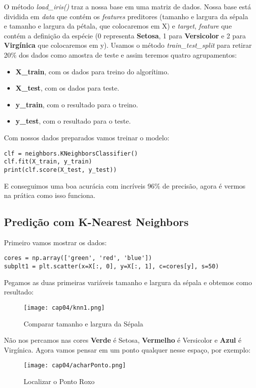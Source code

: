 O método \textit{load\_iris()} traz a nossa base em uma matriz de dados. Nossa base está dividida em \textit{data} que contém os \textit{features} preditores (tamanho e largura da sépala e tamanho e largura da pétala, que colocaremos em X) e \textit{target}, \textit{feature} que contém a definição da espécie (0 representa \textbf{Setosa}, 1 para \textbf{Versicolor} e 2 para \textbf{Virgínica} que colocaremos em y). Usamos o método \textit{train\_test\_split} para retirar 20\% dos dados como amostra de teste e assim teremos quatro agrupamentos:
\begin{itemize}[nolistsep]
	\item \textbf{X\_train}, com os dados para treino do algorítimo.
	\item \textbf{X\_test}, com os dados para teste.
	\item \textbf{y\_train}, com o resultado para o treino.
	\item \textbf{y\_test}, com o resultado para o teste.
\end{itemize}

Com nossos dados preparados vamos treinar o modelo:
\begin{lstlisting}[]
clf = neighbors.KNeighborsClassifier()
clf.fit(X_train, y_train)
print(clf.score(X_test, y_test))
\end{lstlisting}

E conseguimos uma boa acurácia com incríveis 96\% de precisão, agora é vermos na prática como isso funciona. 

\subsection{Predição com K-Nearest Neighbors}
Primeiro vamos mostrar os dados:
\begin{lstlisting}[]
cores = np.array(['green', 'red', 'blue'])
subplt1 = plt.scatter(x=X[:, 0], y=X[:, 1], c=cores[y], s=50)
\end{lstlisting}

Pegamos as duas primeiras variáveis tamanho e largura da sépala e obtemos como resultado:
\begin{figure}[H]
	\centering
	\texttt{[image: cap04/knn1.png]}
	\caption{Comparar tamanho e largura da Sépala}
\end{figure}

Não nos percamos nas cores \textbf{Verde} é Setosa, \textbf{Vermelho} é Versicolor e \textbf{Azul} é Virgínica. Agora vamos pensar em um ponto qualquer nesse espaço, por exemplo:
\begin{figure}[H]
	\centering
	\texttt{[image: cap04/acharPonto.png]}
	\caption{Localizar o Ponto Roxo}
\end{figure}

